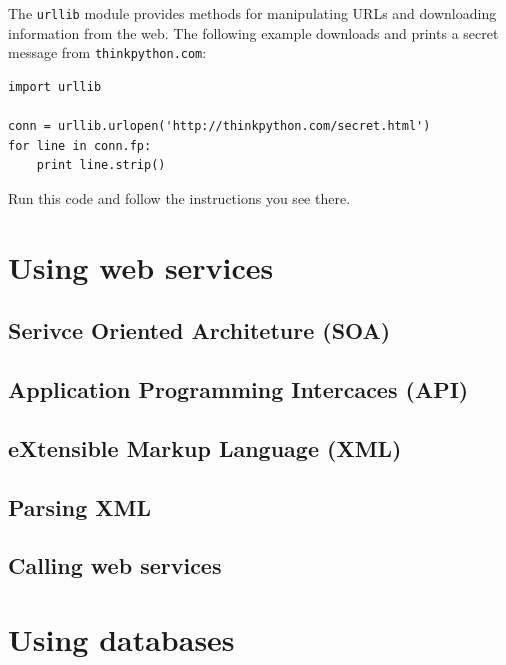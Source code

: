 \documentclass[10pt]{book}
\begin{document}
\begin{ex}
\label{urllib}


The {\tt urllib} module provides methods for manipulating URLs
and downloading information from the web.  The following example
downloads and prints a secret message from {\tt thinkpython.com}:

\beforeverb
\begin{verbatim}
import urllib

conn = urllib.urlopen('http://thinkpython.com/secret.html')
for line in conn.fp:
    print line.strip()
\end{verbatim}
\afterverb

Run this code and follow the instructions you see there.


\end{ex}



\chapter{Using web services}

\section{Serivce Oriented Architeture (SOA)}

\section{Application Programming Intercaces (API)}

\section{eXtensible Markup Language (XML)}

\section{Parsing XML}

\section{Calling web services}


\chapter{Using databases}
\end{document}
